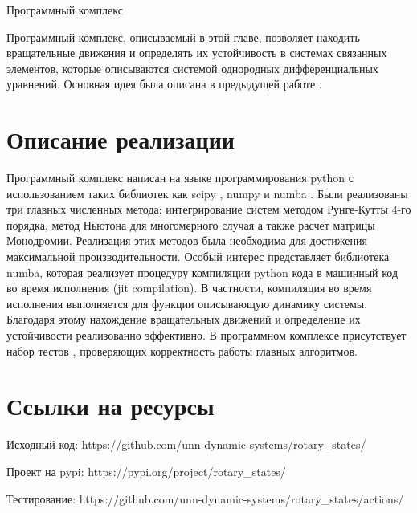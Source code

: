 \begin{chapter}{Программный комплекс}

	Программный комплекс, описываемый в этой главе, позволяет находить вращательные движения и
	определять их устойчивость в системах связанных элементов, которые описываются системой однородных
	дифференциальных уравнений. Основная идея была описана в предыдущей работе \cite{Khorkin}.

\section{Описание реализации}
Программный комплекс написан на языке программирования python с использованием таких
библиотек как scipy \cite{scipy}, numpy \cite{numpy} и numba \cite{numba}.
Были реализованы три главных численных метода: интегрирование систем методом Рунге-Кутты 4-го порядка, метод Ньютона для
многомерного случая а также расчет матрицы Монодромии. Реализация этих методов была необходима для достижения 
максимальной производительности. 
Особый интерес представляет библиотека numba, которая реализует процедуру 
компиляции python кода в машинный код во время исполнения (jit compilation).
В частности, компиляция во время исполнения выполняется для функции описывающую динамику системы.
Благодаря этому нахождение вращательных движений и определение их устойчивости реализованно эффективно.
В программном комплексе присутствует набор тестов \cite{testing}, проверяющих корректность работы главных алгоритмов.





\section{Ссылки на ресурсы}
Исходный код: https://github.com/unn-dynamic-systems/rotary\_states/

Проект на pypi: https://pypi.org/project/rotary\_states/

Тестирование: https://github.com/unn-dynamic-systems/rotary\_states/actions/

\end{chapter}